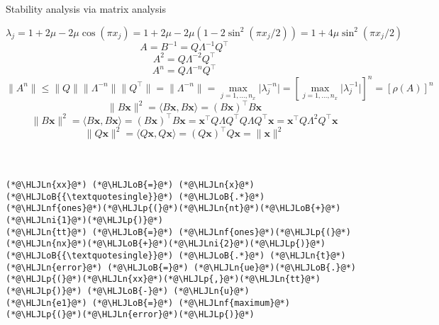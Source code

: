 \documentclass[12pt,a4paper]{article}
\newcommand{\HLJLn}[1]{#1}
\newcommand{\HLJLnf}[1]{\textcolor[RGB]{66,102,213}{#1}}
\newcommand{\HLJLni}[1]{\textcolor[RGB]{59,151,46}{#1}}
\newcommand{\HLJLoB}[1]{\textcolor[RGB]{102,102,102}{\textbf{#1}}}
\newcommand{\HLJLp}[1]{#1}
\begin{document}
\begin{lstlisting}

\end{lstlisting}


Stability analysis via matrix analysis

\[
\lambda_j = 1 + 2\mu - 2\mu\cos\left(\pi x_j  \right) = 1 + 2\mu -2\mu(1 - 2\sin^2(\pi x_j/2)) = 1 + 4\mu\sin^2(\pi x_j/2)
\]
\[
A = B^{-1} = Q\Lambda^{-1}Q^{\top}
\]
\[
A^2 =  Q\Lambda^{-2}Q^{\top}
\]
\[
A^n =  Q\Lambda^{-n}Q^{\top}
\]
\[
\|A^n\| \leq  \|Q\|  \|\Lambda^{-n}\| \|Q^{\top}\| =   \|\Lambda^{-n}\| = \max_{j=1, \ldots, n_x}\vert \lambda^{-n}_j\vert = \left[\max_{j=1, \ldots, n_x}\vert \lambda^{-1}_j\vert\right]^n = \left[\rho(A)\right]^n
\]
\[
\| B \mathbf{x}\|^2 = \langle B \mathbf{x}, B \mathbf{x} \rangle = \left( B \mathbf{x} \right)^{\top}B \mathbf{x} 
\]
\[
\| B \mathbf{x}\|^2 = \langle B \mathbf{x}, B \mathbf{x} \rangle = \left( B \mathbf{x} \right)^{\top}B \mathbf{x} = \mathbf{x}^{\top} Q\Lambda Q^{\top} Q \Lambda Q^{\top}\mathbf{x} =  \mathbf{x}^{\top} Q\Lambda^2  Q^{\top}\mathbf{x}
\]
\[
\| Q\mathbf{x}\|^2 = \langle Q \mathbf{x}, Q \mathbf{x} \rangle = \left( Q \mathbf{x} \right)^{\top}Q \mathbf{x}  = \| \mathbf{x} \|^2
\]

\begin{lstlisting}

\end{lstlisting}


\begin{lstlisting}

\end{lstlisting}


\begin{lstlisting}

\end{lstlisting}


\begin{lstlisting}
(*@\HLJLn{xx}@*) (*@\HLJLoB{=}@*) (*@\HLJLn{x}@*)(*@\HLJLoB{{\textquotesingle}}@*) (*@\HLJLoB{.*}@*) (*@\HLJLnf{ones}@*)(*@\HLJLp{(}@*)(*@\HLJLn{nt}@*)(*@\HLJLoB{+}@*)(*@\HLJLni{1}@*)(*@\HLJLp{)}@*)
(*@\HLJLn{tt}@*) (*@\HLJLoB{=}@*) (*@\HLJLnf{ones}@*)(*@\HLJLp{(}@*)(*@\HLJLn{nx}@*)(*@\HLJLoB{+}@*)(*@\HLJLni{2}@*)(*@\HLJLp{)}@*)(*@\HLJLoB{{\textquotesingle}}@*) (*@\HLJLoB{.*}@*) (*@\HLJLn{t}@*)
(*@\HLJLn{error}@*) (*@\HLJLoB{=}@*) (*@\HLJLn{ue}@*)(*@\HLJLoB{.}@*)(*@\HLJLp{(}@*)(*@\HLJLn{xx}@*)(*@\HLJLp{,}@*)(*@\HLJLn{tt}@*)(*@\HLJLp{)}@*) (*@\HLJLoB{-}@*) (*@\HLJLn{u}@*) 
(*@\HLJLn{e1}@*) (*@\HLJLoB{=}@*) (*@\HLJLnf{maximum}@*)(*@\HLJLp{(}@*)(*@\HLJLn{error}@*)(*@\HLJLp{)}@*)
\end{lstlisting}
\end{document}
